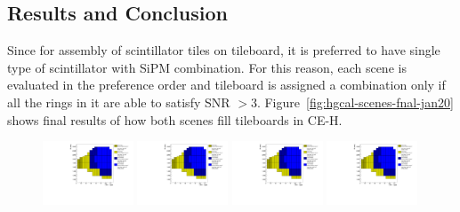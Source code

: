 \subsection{
  Results and Conclusion
}

Since for assembly of scintillator tiles on tileboard, it is preferred
to have single type of scintillator with \gls{SiPM} combination.
For this reason, each scene is evaluated in the preference order
and tileboard is assigned a combination only
if all the rings in it are able to satisfy \gls{SNR} \( > 3\).
Figure~\ref{fig:hgcal-scenes-fnal-jan20} shows final
results of how both scenes fill tileboards in \gls{CE-H}.

\begin{figure}[!ht]
  \centering
  \includegraphics[trim={400 370 20 10},clip,width=0.24\textwidth]{figures/hgcal/plot_scenes/sceneA_jan20_fix_vto2p0_with9mm2.pdf}
  \includegraphics[trim={400 310 20 70},clip,width=0.24\textwidth]{figures/hgcal/plot_scenes/sceneA_jan20_fix_vto2p0_with9mm2.pdf}
  \includegraphics[trim={400 250 20 130},clip,width=0.24\textwidth]{figures/hgcal/plot_scenes/sceneA_jan20_fix_vto2p0_with9mm2.pdf}
  \includegraphics[trim={400 190 20 190},clip,width=0.24\textwidth]{figures/hgcal/plot_scenes/sceneA_jan20_fix_vto2p0_with9mm2.pdf}
  \begin{minipage}[c]{0.49\textwidth}

\end{minipage}
\end{figure}
